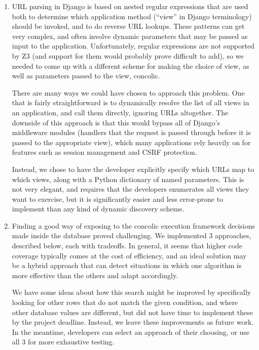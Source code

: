 \documentclass{scrartcl}
\begin{document}
\begin{enumerate}
\item URL parsing in Django is based on nested regular expressions that
  are used both to determine which application method (``view''
  in Django terminology) should be invoked, and to do reverse URL
  lookups. These patterns can get very complex, and often involve
  dynamic parameters that may be passed as input to the
  application. Unfortunately, regular expressions are not
  supported by Z3 (and support for them would probably prove
  difficult to add), so we needed to come up with a different
  scheme for making the choice of view, as well as parameters
  passed to the view, concolic.

  There are many ways we could have chosen to approach this
  problem. One that is fairly straightforward is to dynamically
  resolve the list of all views in an application, and call them
  directly, ignoring URLs altogether.  The downside of this
  approach is that this would bypass all of Django's middleware
  modules (handlers that the request is passed through before it
  is passed to the appropriate view), which many applications
  rely heavily on for features such as session management and
  CSRF protection.

  Instead, we chose to have the developer explicitly specify
  which URLs map to which views, along with a Python dictionary
  of named parameters. This is not very elegant, and requires
  that the developers enumerates all views they want to exercise,
  but it is significantly easier and less error-prone to
  implement than any kind of dynamic discovery scheme.

\item Finding a good way of exposing to the concolic execution framework
  decisions made inside the database proved challenging. We implemented 3
  approaches, described below, each with tradeoffs. In general, it seems
  that higher code coverage typically comes at the cost of efficiency, and an
  ideal solution may be a hybrid approach that can detect situations in which
  one algorithm is more effective than the others and adapt accordingly.

  We have some ideas about how this search might be improved by
  specifically looking for other rows that do not match the given
  condition, and where other database values are different, but
  did not have time to implement these by the project deadline.
  Instead, we leave these improvements as future work. In the
  meantime, developers can select an approach of their choosing, or use all 3
  for more exhaustive testing.


\end{enumerate}
\end{document}
